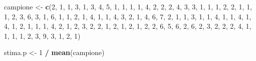 \documentclass[]{book}
\newenvironment{Shaded}{\begin{snugshade}}{\end{snugshade}}
\newcommand{\KeywordTok}[1]{\textcolor[rgb]{0.13,0.29,0.53}{\textbf{#1}}}
\newcommand{\DecValTok}[1]{\textcolor[rgb]{0.00,0.00,0.81}{#1}}
\newcommand{\StringTok}[1]{\textcolor[rgb]{0.31,0.60,0.02}{#1}}
\newcommand{\OperatorTok}[1]{\textcolor[rgb]{0.81,0.36,0.00}{\textbf{#1}}}
\newcommand{\NormalTok}[1]{#1}
\begin{document}
\begin{Shaded}
\begin{Highlighting}[]
\NormalTok{campione <-}\StringTok{ }\KeywordTok{c}\NormalTok{(}\DecValTok{2}\NormalTok{, }\DecValTok{1}\NormalTok{, }\DecValTok{1}\NormalTok{, }\DecValTok{3}\NormalTok{, }\DecValTok{1}\NormalTok{, }\DecValTok{3}\NormalTok{, }\DecValTok{4}\NormalTok{, }\DecValTok{5}\NormalTok{, }\DecValTok{1}\NormalTok{, }\DecValTok{1}\NormalTok{, }\DecValTok{1}\NormalTok{, }\DecValTok{1}\NormalTok{, }\DecValTok{4}\NormalTok{, }\DecValTok{2}\NormalTok{, }\DecValTok{2}\NormalTok{, }\DecValTok{2}\NormalTok{, }\DecValTok{4}\NormalTok{, }\DecValTok{3}\NormalTok{, }\DecValTok{3}\NormalTok{, }\DecValTok{1}\NormalTok{, }
         \DecValTok{1}\NormalTok{, }\DecValTok{1}\NormalTok{, }\DecValTok{2}\NormalTok{, }\DecValTok{2}\NormalTok{, }\DecValTok{1}\NormalTok{, }\DecValTok{1}\NormalTok{, }\DecValTok{1}\NormalTok{, }\DecValTok{2}\NormalTok{, }\DecValTok{3}\NormalTok{, }\DecValTok{6}\NormalTok{, }\DecValTok{3}\NormalTok{, }\DecValTok{1}\NormalTok{, }\DecValTok{6}\NormalTok{, }\DecValTok{1}\NormalTok{, }\DecValTok{1}\NormalTok{, }\DecValTok{2}\NormalTok{, }\DecValTok{1}\NormalTok{, }\DecValTok{4}\NormalTok{, }\DecValTok{1}\NormalTok{, }\DecValTok{1}\NormalTok{, }
         \DecValTok{4}\NormalTok{, }\DecValTok{3}\NormalTok{, }\DecValTok{2}\NormalTok{, }\DecValTok{1}\NormalTok{, }\DecValTok{4}\NormalTok{, }\DecValTok{6}\NormalTok{, }\DecValTok{7}\NormalTok{, }\DecValTok{2}\NormalTok{, }\DecValTok{1}\NormalTok{, }\DecValTok{1}\NormalTok{, }\DecValTok{3}\NormalTok{, }\DecValTok{1}\NormalTok{, }\DecValTok{1}\NormalTok{, }\DecValTok{4}\NormalTok{, }\DecValTok{1}\NormalTok{, }\DecValTok{1}\NormalTok{, }\DecValTok{4}\NormalTok{, }\DecValTok{1}\NormalTok{, }\DecValTok{4}\NormalTok{, }\DecValTok{1}\NormalTok{, }
         \DecValTok{2}\NormalTok{, }\DecValTok{1}\NormalTok{, }\DecValTok{1}\NormalTok{, }\DecValTok{1}\NormalTok{, }\DecValTok{4}\NormalTok{, }\DecValTok{2}\NormalTok{, }\DecValTok{1}\NormalTok{, }\DecValTok{2}\NormalTok{, }\DecValTok{3}\NormalTok{, }\DecValTok{2}\NormalTok{, }\DecValTok{2}\NormalTok{, }\DecValTok{1}\NormalTok{, }\DecValTok{2}\NormalTok{, }\DecValTok{1}\NormalTok{, }\DecValTok{2}\NormalTok{, }\DecValTok{1}\NormalTok{, }\DecValTok{2}\NormalTok{, }\DecValTok{2}\NormalTok{, }\DecValTok{6}\NormalTok{, }\DecValTok{5}\NormalTok{, }
         \DecValTok{6}\NormalTok{, }\DecValTok{2}\NormalTok{, }\DecValTok{6}\NormalTok{, }\DecValTok{2}\NormalTok{, }\DecValTok{3}\NormalTok{, }\DecValTok{2}\NormalTok{, }\DecValTok{2}\NormalTok{, }\DecValTok{2}\NormalTok{, }\DecValTok{4}\NormalTok{, }\DecValTok{1}\NormalTok{, }\DecValTok{1}\NormalTok{, }\DecValTok{1}\NormalTok{, }\DecValTok{1}\NormalTok{, }\DecValTok{2}\NormalTok{, }\DecValTok{3}\NormalTok{, }\DecValTok{9}\NormalTok{, }\DecValTok{3}\NormalTok{, }\DecValTok{1}\NormalTok{, }\DecValTok{2}\NormalTok{, }\DecValTok{1}\NormalTok{)}

\NormalTok{stima.p <-}\StringTok{ }\DecValTok{1} \OperatorTok{/}\StringTok{ }\KeywordTok{mean}\NormalTok{(campione) }
\end{Highlighting}
\end{Shaded}
\end{document}
